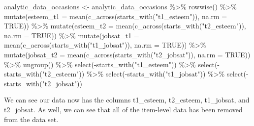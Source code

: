 \documentclass[
]{krantz}
\makeatletter
\newenvironment{Shaded}{\begin{snugshade}}{\end{snugshade}}
\newcommand{\AttributeTok}[1]{\textcolor[rgb]{0.61,0.61,0.61}{#1}}
\newcommand{\ConstantTok}[1]{\textcolor[rgb]{0,0,0}{#1}}
\newcommand{\FunctionTok}[1]{\textcolor[rgb]{0,0,0}{#1}}
\newcommand{\NormalTok}[1]{#1}
\newcommand{\OtherTok}[1]{\textcolor[rgb]{0.37,0.37,0.37}{#1}}
\newcommand{\SpecialCharTok}[1]{\textcolor[rgb]{0,0,0}{#1}}
\newcommand{\StringTok}[1]{\textcolor[rgb]{0.5,0.5,0.5}{#1}}
\newenvironment{kframe}{%
\medskip{}
\setlength{\fboxsep}{.8em}
 \def\at@end@of@kframe{}%
 \ifinner\ifhmode%
  \def\at@end@of@kframe{\end{minipage}}%
  \begin{minipage}{\columnwidth}%
 \fi\fi%
 \def\FrameCommand##1{\hskip\@totalleftmargin \hskip-\fboxsep
 \colorbox{shadecolor}{##1}\hskip-\fboxsep
     \hskip-\linewidth \hskip-\@totalleftmargin \hskip\columnwidth}%
 \MakeFramed {\advance\hsize-\width
   \@totalleftmargin\z@ \linewidth\hsize
   \@setminipage}}%
 {\par\unskip\endMakeFramed%
 \at@end@of@kframe}
\renewenvironment{Shaded}{\begin{kframe}}{\end{kframe}}
\makeatother
\begin{document}
\begin{Shaded}
\begin{Highlighting}[]
\NormalTok{analytic\_data\_occasions }\OtherTok{\textless{}{-}}\NormalTok{ analytic\_data\_occasions }\SpecialCharTok{\%\textgreater{}\%} 
  \FunctionTok{rowwise}\NormalTok{() }\SpecialCharTok{\%\textgreater{}\%} 
  \FunctionTok{mutate}\NormalTok{(}\AttributeTok{esteem\_t1 =} \FunctionTok{mean}\NormalTok{(}\FunctionTok{c\_across}\NormalTok{(}\FunctionTok{starts\_with}\NormalTok{(}\StringTok{"t1\_esteem"}\NormalTok{)),}
                               \AttributeTok{na.rm =} \ConstantTok{TRUE}\NormalTok{)) }\SpecialCharTok{\%\textgreater{}\%}
  \FunctionTok{mutate}\NormalTok{(}\AttributeTok{esteem\_t2 =} \FunctionTok{mean}\NormalTok{(}\FunctionTok{c\_across}\NormalTok{(}\FunctionTok{starts\_with}\NormalTok{(}\StringTok{"t2\_esteem"}\NormalTok{)),}
                               \AttributeTok{na.rm =} \ConstantTok{TRUE}\NormalTok{)) }\SpecialCharTok{\%\textgreater{}\%}
  \FunctionTok{mutate}\NormalTok{(}\AttributeTok{jobsat\_t1 =} \FunctionTok{mean}\NormalTok{(}\FunctionTok{c\_across}\NormalTok{(}\FunctionTok{starts\_with}\NormalTok{(}\StringTok{"t1\_jobsat"}\NormalTok{)),}
                               \AttributeTok{na.rm =} \ConstantTok{TRUE}\NormalTok{)) }\SpecialCharTok{\%\textgreater{}\%}
  \FunctionTok{mutate}\NormalTok{(}\AttributeTok{jobsat\_t2 =} \FunctionTok{mean}\NormalTok{(}\FunctionTok{c\_across}\NormalTok{(}\FunctionTok{starts\_with}\NormalTok{(}\StringTok{"t2\_jobsat"}\NormalTok{)),}
                               \AttributeTok{na.rm =} \ConstantTok{TRUE}\NormalTok{)) }\SpecialCharTok{\%\textgreater{}\%}
  \FunctionTok{ungroup}\NormalTok{() }\SpecialCharTok{\%\textgreater{}\%}
  \FunctionTok{select}\NormalTok{(}\SpecialCharTok{{-}}\FunctionTok{starts\_with}\NormalTok{(}\StringTok{"t1\_esteem"}\NormalTok{)) }\SpecialCharTok{\%\textgreater{}\%}
  \FunctionTok{select}\NormalTok{(}\SpecialCharTok{{-}}\FunctionTok{starts\_with}\NormalTok{(}\StringTok{"t2\_esteem"}\NormalTok{)) }\SpecialCharTok{\%\textgreater{}\%}
  \FunctionTok{select}\NormalTok{(}\SpecialCharTok{{-}}\FunctionTok{starts\_with}\NormalTok{(}\StringTok{"t1\_jobsat"}\NormalTok{)) }\SpecialCharTok{\%\textgreater{}\%}
  \FunctionTok{select}\NormalTok{(}\SpecialCharTok{{-}}\FunctionTok{starts\_with}\NormalTok{(}\StringTok{"t2\_jobsat"}\NormalTok{))}
\end{Highlighting}
\end{Shaded}

We can see our data now has the columns t1\_esteem, t2\_esteem, t1\_jobsat, and t2\_jobsat. As well, we can see that all of the item-level data has been removed from the data set.
\end{document}
